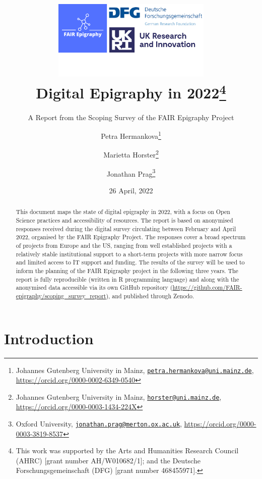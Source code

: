\documentclass[
  12pt,
]{scrreprt}
\title{\includegraphics[width=3in,height=\textheight]{../assets/banner.png}\\
Digital Epigraphy in 2022\footnote{This work was supported by the Arts
  and Humanities Research Council (AHRC) {[}grant number
  AH/W010682/1{]}; and the Deutsche Forschungsgemeinschaft (DFG)
  {[}grant number 468455971{]}.}}
\subtitle{A Report from the Scoping Survey of the FAIR Epigraphy
Project}
\author{Petra Hermankova\footnote{Johannes Gutenberg University in
  Mainz,
  \href{mailto:petra.hermankova@uni.mainz.de}{\nolinkurl{petra.hermankova@uni.mainz.de}},
  \url{https://orcid.org/0000-0002-6349-0540}} \and Marietta
Horster\footnote{Johannes Gutenberg University in Mainz,
  \href{mailto:horster@uni.mainz.de}{\nolinkurl{horster@uni.mainz.de}},
  \url{https://orcid.org/0000-0003-1434-224X}} \and Jonathan
Prag\footnote{Oxford University,
  \href{mailto:jonathan.prag@merton.ox.ac.uk}{\nolinkurl{jonathan.prag@merton.ox.ac.uk}},
  \url{https://orcid.org/0000-0003-3819-8537}}}
\date{26 April, 2022}
\begin{document}
\maketitle
\begin{abstract}
This document maps the state of digital epigraphy in 2022, with a focus
on Open Science practices and accessibility of resources. The report is
based on anonymised responses received during the digital survey
circulating between February and April 2022, organised by the FAIR
Epigraphy Project. The responses cover a broad spectrum of projects from
Europe and the US, ranging from well established projects with a
relatively stable institutional support to a short-term projects with
more narrow focus and limited access to IT support and funding. The
results of the survey will be used to inform the planning of the FAIR
Epigraphy project in the following three years. The report is fully
reproducible (written in R programming language) and along with the
anonymised data accessible via its own GitHub repository
(\url{https://github.com/FAIR-epigraphy/scoping_survey_report}), and
published through Zenodo.
\end{abstract}

{
\hypersetup{linkcolor=}
\setcounter{tocdepth}{2}
\tableofcontents
}
\hypertarget{introduction}{%
\chapter{Introduction}\label{introduction}}
\end{document}
